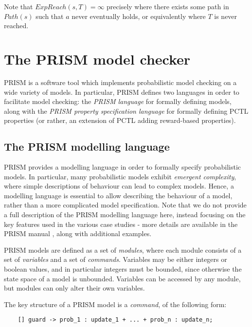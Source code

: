 Note that $ExpReach(s, T) = \infty$ precisely where there exists some path in $Path(s)$ such that $a$ never eventually holds, or equivalently where $T$ is never reached.

\section{The PRISM model checker}
\label{back:PRISM}

PRISM \cite{kwiatkowska_prism_2011} is a software tool which implements probabilistic model checking on a wide variety of models. In particular, PRISM defines two languages in order to facilitate model checking: the \emph{PRISM language} for formally defining models, along with the \emph{PRISM property specification language} for formally defining PCTL properties (or rather, an extension of PCTL adding reward-based properties).

\subsection{The PRISM modelling language}
\label{back:PRISM-modelling}

PRISM provides a modelling language in order to formally specify probabilistic models. In particular, many probabilistic models exhibit \emph{emergent complexity}, where simple descriptions of behaviour can lead to complex models. Hence, a modelling language is essential to allow describing the behaviour of a model, rather than a more complicated model specification. Note that we do not provide a full description of the PRISM modelling language here, instead focusing on the key features used in the various case studies - more details are available in the PRISM manual \cite{noauthor_prism_nodate}, along with additional examples.

PRISM models are defined as a set of \emph{modules}, where each module consists of a set of \emph{variables} and a set of \emph{commands}. Variables may be either integers or boolean values, and in particular integers must be bounded, since otherwise the state space of a model is unbounded. Variables can be accessed by any module, but modules can only alter their own variables.

The key structure of a PRISM model is a \emph{command}, of the following form:

\begin{verbatim}
    [] guard -> prob_1 : update_1 + ... + prob_n : update_n;
\end{verbatim}

